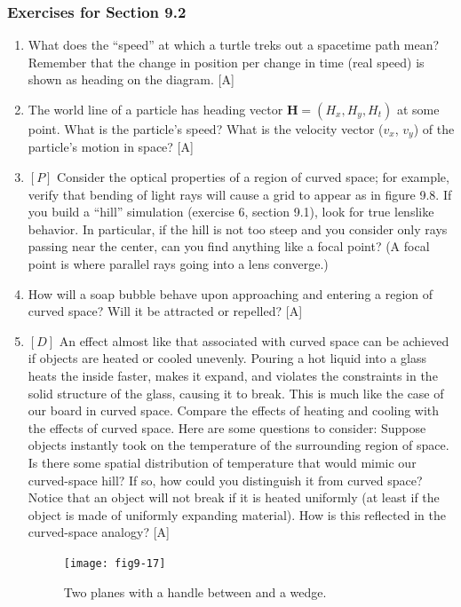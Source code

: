 \documentclass{book}
\begin{document}
\subsubsection{Exercises for Section 9.2}
\begin{enumerate}
\item What does the ``speed'' at which a turtle treks out a spacetime path
mean? Remember that the change in position per change in time (real
speed) is shown as heading on the diagram. [A]

\item The world line of a particle has heading vector $\mathbf{H} = (H_x, H_y, H_t)$ at
some point. What is the particle's speed? What is the velocity vector
($v_x$, $v_y$) of the particle's motion in space? [A]

\item $[P]$ Consider the optical properties of a region of curved space; for
example, verify that bending of light rays will cause a grid to appear as
in figure 9.8. If you build a ``hill'' simulation (exercise 6, section 9.1),
look for true lenslike behavior. In particular, if the hill is not too steep
and you consider only rays passing near the center, can you find anything
like a focal point? (A focal point is where parallel rays going into a lens
converge.)

\item How will a soap bubble behave upon approaching and entering a
region of curved space? Will it be attracted or repelled? [A]

\item $[D]$ An effect almost like that associated with curved space can be
achieved if objects are heated or cooled unevenly. Pouring a hot liquid
into a glass heats the inside faster, makes it expand, and violates the
constraints in the solid structure of the glass, causing it to break. This
is much like the case of our board in curved space. Compare the effects
of heating and cooling with the effects of curved space. Here are some
questions to consider: Suppose objects instantly took on the temperature
of the surrounding region of space. Is there some spatial distribution of
temperature that would mimic our curved-space hill? If so, how could
you distinguish it from curved space? Notice that an object will not
break if it is heated uniformly (at least if the object is made of uniformly
expanding material). How is this reflected in the curved-space analogy?
[A]

\begin{figure}
\begin{center}
\texttt{[image: fig9-17]}
\caption{Two planes with a handle between and a wedge.}
\end{center}
\end{figure}


\end{enumerate}
\end{document}
